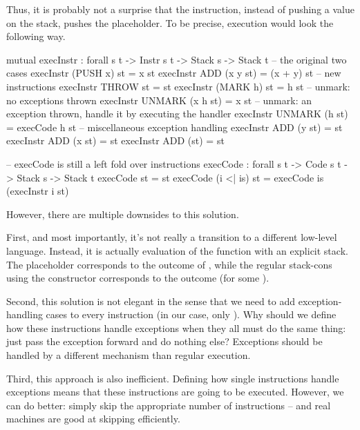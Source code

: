 Thus, it is probably not a surprise that the  instruction, instead of pushing
a value on the stack, pushes the \ident{\void} placeholder. To be precise, execution would
look the following way. \label{sec:placeholder}
\begin{code}
  mutual
    execInstr : forall {s t} -> Instr s t -> Stack s -> Stack t
    -- the original two cases
    execInstr (PUSH x) st = x \scons st
    execInstr ADD (x \scons y \scons st) = (x + y) \scons st
    -- new instructions
    execInstr THROW st = \void\scons st
    execInstr (MARK h) st = h \sconsh st
    -- unmark: no exceptions thrown
    execInstr UNMARK (x \scons h \sconsh st) = x \scons st
    -- unmark: an exception thrown, handle it by executing the handler
    execInstr UNMARK (\void\scons h \sconsh st) = execCode h st
    -- miscellaneous exception handling
    execInstr ADD (\void\scons y \scons st) = \void\scons st
    execInstr ADD (x \scons \void\scons st) = \void\scons st
    execInstr ADD (\void\scons \void\scons st) = \void\scons st

    -- execCode is still a left fold over instructions
    execCode : forall {s t} -> Code s t -> Stack s -> Stack t
    execCode \nil st = st
    execCode (i <| is) st = execCode is (execInstr i st)
\end{code}

\noindent However, there are multiple downsides to this solution.%
\label{sec:placeholders-objections}

First, and most importantly, it's not really a transition to a different
low-level language.  Instead, it is actually evaluation of the function
 with an explicit stack. The placeholder \ident{\void}
corresponds to the outcome  of , while the regular
stack-cons using the constructor \ident{\scons\!\!} corresponds to the outcome
 (for some ).

Second, this solution is not elegant in the sense that we need to add
exception-handling cases to every instruction (in our case, only ).
Why should we define how these instructions handle exceptions when they all
must do the same thing: just pass the exception forward and do nothing else?
Exceptions should be handled by a different mechanism than regular execution.

Third, this approach is also inefficient. Defining how single instructions
handle exceptions means that these instructions are going to be executed.
However, we can do better: simply skip the appropriate number of instructions
-- and real machines are good at skipping efficiently.

